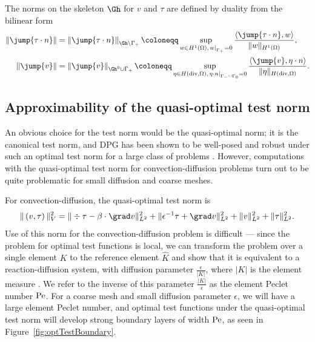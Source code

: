 The norms on the skeleton $\Gh$ for $v$ and $\tau$ are defined by duality from the bilinear form
\begin{align*}
\left\|\jump{\tau\cdot n}\right\| &= \left\|\jump{\tau\cdot n}\right\|_{\Gh \setminus \Gamma_+} \coloneqq \sup_{w\in H^1(\Omega), \left.w\right|_{\Gamma_+} = 0} \frac{\langle \jump{\tau \cdot n}, w\rangle}{\|w\|_{H^1(\Omega)}},\\
\left\|\jump{v}\right\|&=\left\|\jump{v}\right\|_{\Gh^0 \cup \Gamma_+} \coloneqq \sup_{\eta\in H({\rm div},\Omega), \left.\eta\cdot n\right|_{\Gamma_- \cup \Gamma_0} = 0} \frac{\langle \jump{v}, \eta\cdot n\rangle}{\|\eta\|_{H({\rm div},\Omega)}}.
\end{align*}

\subsection{Approximability of the quasi-optimal test norm}
An obvious choice for the test norm would be the quasi-optimal norm; it is the canonical test norm, and DPG has been shown to be well-posed and robust under such an optimal test norm for a large class of problems \cite{DPGrobustness,Bui-ThanhDemkowiczGhattas11b, stokesDPG}. However, computations with the quasi-optimal test norm for convection-diffusion problems turn out to be quite problematic for small diffusion and coarse meshes.  

For convection-diffusion, the quasi-optimal test norm is 
\[
\|\left(v,\tau\right)\|_V^2 = \| \div \tau - \beta \cdot \grad v
\|_{L^2}^2 + \| \epsilon^{-1} \tau + \grad v \|_{L^2}^2 +
\|v\|_{L^2}^2 + \|\tau\|_{L^2}^2.
\]
Use of this norm for the convection-diffusion problem is difficult --- since the problem  for optimal test functions is local, we can transform the problem over a single element $K$ to the reference element $\widehat{K}$ and show that it is equivalent to a reaction-diffusion system, with diffusion parameter $\frac{\epsilon}{|K|}$, where $|K|$ is the element measure \cite{DBLP:journals/procedia/NiemiCC11}. We refer to the inverse of this parameter $\frac{|K|}{\epsilon}$ as the element Peclet number $\rm Pe$. For a coarse mesh and small diffusion parameter $\epsilon$, we will have a large element Peclet number, and optimal test functions under the quasi-optimal test norm will develop strong boundary layers of width $\rm Pe$, as seen in Figure~\ref{fig:optTestBoundary}.

